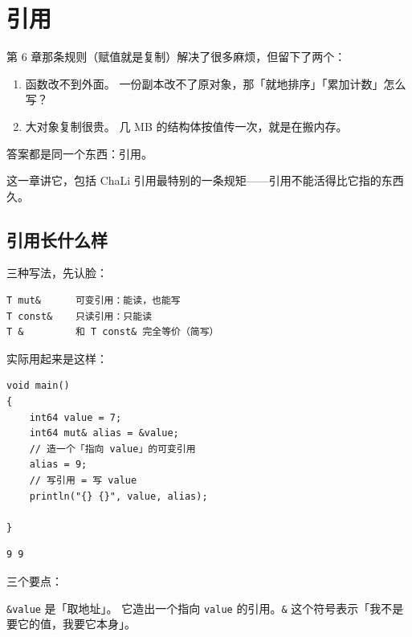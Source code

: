 \chapter{引用}
\label{ch:07}

第 6 章那条规则（赋值就是复制）解决了很多麻烦，但留下了两个：

\begin{enumerate}

\item 函数改不到外面。 一份副本改不了原对象，那「就地排序」「累加计数」怎么写？

\item 大对象复制很贵。 几 MB 的结构体按值传一次，就是在搬内存。

\end{enumerate}

答案都是同一个东西：引用。

这一章讲它，包括 ChaLi 引用最特别的一条规矩——引用不能活得比它指的东西久。

\section{引用长什么样}

三种写法，先认脸：

\par
\medskip
\begin{lstlisting}[style=out]
T mut&      可变引用：能读，也能写
T const&    只读引用：只能读
T &         和 T const& 完全等价（简写）
\end{lstlisting}
\par
\medskip

实际用起来是这样：

\par
\medskip
\begin{lstlisting}[style=chali]
void main()
{
    int64 value = 7;
    int64 mut& alias = &value;
    // 造一个「指向 value」的可变引用
    alias = 9;
    // 写引用 = 写 value
    println("{} {}", value, alias);

}
\end{lstlisting}
\par
\medskip

\par
\medskip
\begin{lstlisting}[style=out]
9 9
\end{lstlisting}
\par
\medskip

三个要点：

\texttt{\&value} 是「取地址」。 它造出一个指向 \texttt{value} 的引用。\texttt{\&} 这个符号表示「我不是要它的值，我要它本身」。

